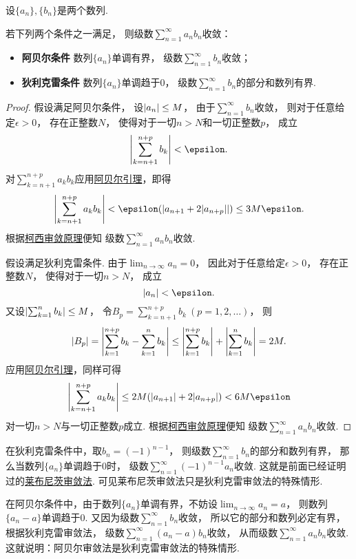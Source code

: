 \begin{theorem}\label{theorem:无穷级数.无穷级数的阿贝尔--狄利克雷审敛法}
设\(\{a_n\},\{b_n\}\)是两个数列.

若下列两个条件之一满足，
则级数\(\sum_{n=1}^\infty a_n b_n\)收敛：\begin{itemize}
	\item {\rm\bf 阿贝尔条件}
	数列\(\{a_n\}\)单调有界，
	级数\(\sum_{n=1}^\infty b_n\)收敛；

	\item {\rm\bf 狄利克雷条件}
	数列\(\{a_n\}\)单调趋于\(0\)，
	级数\(\sum_{n=1}^\infty b_n\)的部分和数列有界.
\end{itemize}
\begin{proof}
假设满足阿贝尔条件，
设\(\abs{a_n} \leq M\)，
由于\(\sum_{n=1}^\infty b_n\)收敛，
则对于任意给定\(\epsilon>0\)，
存在正整数\(N\)，
使得对于一切\(n>N\)和一切正整数\(p\)，
成立\[
	\abs{\sum_{k=n+1}^{n+p} b_k} < \epsilon.
\]
对\(\sum_{k=n+1}^{n+p} a_k b_k\)应用\hyperref[theorem:无穷级数.阿贝尔引理]{阿贝尔引理}，即得\[
	\abs{\sum_{k=n+1}^{n+p} a_k b_k}
	< \epsilon (\abs{a_{n+1} + 2 \abs{a_{n+p}}})
	\leq 3 M \epsilon.
\]
根据\hyperref[theorem:无穷级数.级数的柯西审敛原理]{柯西审敛原理}便知
级数\(\sum_{n=1}^\infty a_n b_n\)收敛.

假设满足狄利克雷条件.
由于\(\lim_{n\to\infty} a_n = 0\)，
因此对于任意给定\(\epsilon>0\)，
存在正整数\(N\)，
使得对于一切\(n>N\)，
成立\[
	\abs{a_n} < \epsilon.
\]
又设\(\abs{\sum_{k=1}^n b_k} \leq M\)，
令\(B_p = \sum_{k=n+1}^{n+p} b_k\ (p=1,2,\dotsc)\)，
则\[
	\abs{B_p}
	= \abs{\sum_{k=1}^{n+p} b_k - \sum_{k=1}^n b_k}
	\leq \abs{\sum_{k=1}^{n+p} b_k} + \abs{\sum_{k=1}^n b_k}
	= 2 M.
\]
应用\hyperref[theorem:无穷级数.阿贝尔引理]{阿贝尔引理}，同样可得\[
	\abs{\sum_{k=n+1}^{n+p} a_k b_k}
	\leq 2 M (\abs{a_{n+1}} + 2 \abs{a_{n+p}})
	< 6 M \epsilon
\]对一切\(n>N\)与一切正整数\(p\)成立.
根据\hyperref[theorem:无穷级数.级数的柯西审敛原理]{柯西审敛原理}便知
级数\(\sum_{n=1}^\infty a_n b_n\)收敛.
\end{proof}
\end{theorem}
\begin{remark}
在狄利克雷条件中，取\(b_n = (-1)^{n-1}\)，
则级数\(\sum_{n=1}^\infty b_n\)的部分和数列有界，
那么当数列\(\{a_n\}\)单调趋于\(0\)时，
级数\(\sum_{n=1}^\infty (-1)^{n-1} a_n\)收敛.
这就是前面已经证明过的\hyperref[theorem:无穷级数.莱布尼茨定理]{莱布尼茨审敛法}.
可见莱布尼茨审敛法只是狄利克雷审敛法的特殊情形.

在阿贝尔条件中，由于数列\(\{a_n\}\)单调有界，不妨设\(\lim_{n\to\infty} a_n = a\)，
则数列\(\{a_n - a\}\)单调趋于\(0\).
又因为级数\(\sum_{n=1}^\infty b_n\)收敛，
所以它的部分和数列必定有界，根据狄利克雷审敛法，
级数\(\sum_{n=1}^\infty (a_n - a) b_n\)收敛，
从而级数\(\sum_{n=1}^\infty a_n b_n\)收敛.
这就说明：阿贝尔审敛法是狄利克雷审敛法的特殊情形.
\end{remark}


